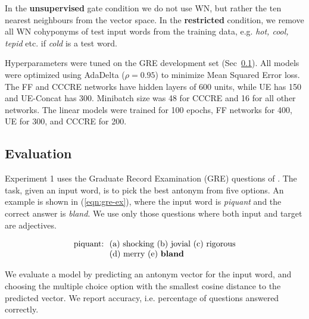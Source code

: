\documentclass[11pt]{article}
\begin{document}
In the {\bf unsupervised} gate condition we do not use WN, but rather the ten nearest neighbours from the 
vector space. 
In the {\bf restricted} condition, we remove all WN cohyponyms of test input words from the training data, e.g. {\it hot, cool, tepid} etc. if {\it cold} is a test word.

Hyperparameters were tuned on the GRE development set (Sec~\ref{sec:eval}). All models were optimized using AdaDelta ($\rho = 0.95$) to minimize Mean Squared Error loss. The FF and CCCRE networks have hidden layers of 600 units, while UE has 150 and UE-Concat has 300. Minibatch size was 48 for CCCRE and 16 for all other networks. The linear models were trained for 100 epochs, FF networks for 400, UE for 300, and CCCRE for 200.

\subsection{Evaluation}
\label{sec:eval}

Experiment 1 uses the Graduate Record Examination (GRE) questions of \citet{mohammad:13}. The task, given an input word, is to pick the best antonym from five options. An example 
is shown in (\ref{eqn:gre-ex}), where the input word is {\it piquant} and the correct answer is {\it bland}. We use only those questions 
where both input and target are adjectives.

\vspace{-6mm}
\begin{equation}
\begin{split}
\textrm{piquant:\ \ } & \textrm{(a) shocking (b) jovial (c) rigorous} \\[-1mm]
& \textrm{(d) merry (e) {\bf bland}}
\label{eqn:gre-ex}
\end{split}
\end{equation}
\vspace{-6mm}

We evaluate a model by predicting an antonym vector for the input word, and choosing the multiple choice option with the smallest cosine distance to the predicted vector. We report accuracy, i.e. percentage of questions answered correctly.
\end{document}
